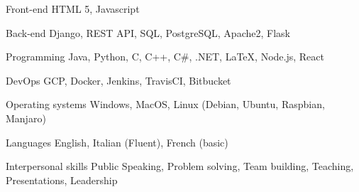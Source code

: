 

\begin{cvskills}

  \cvskill
    {Front-end} %
    {HTML 5, Javascript} %

  \cvskill
    {Back-end} %
    {Django, REST API, SQL, PostgreSQL, Apache2, Flask} %

  \cvskill
    {Programming} %
    {Java, Python, C, C++, C\#, .NET, LaTeX, Node.js, React} %

    \cvskill
    {DevOps}
    {GCP, Docker, Jenkins, TravisCI, Bitbucket}
    
    \cvskill
    {Operating systems}
    {Windows, MacOS, Linux (Debian, Ubuntu, Raspbian, Manjaro)}
    
  \cvskill
    {Languages} %
    {English, Italian (Fluent), French (basic)} %

    \cvskill
    {Interpersonal skills}
    {Public Speaking, Problem solving, Team building, Teaching, Presentations, Leadership}
    
\end{cvskills}

